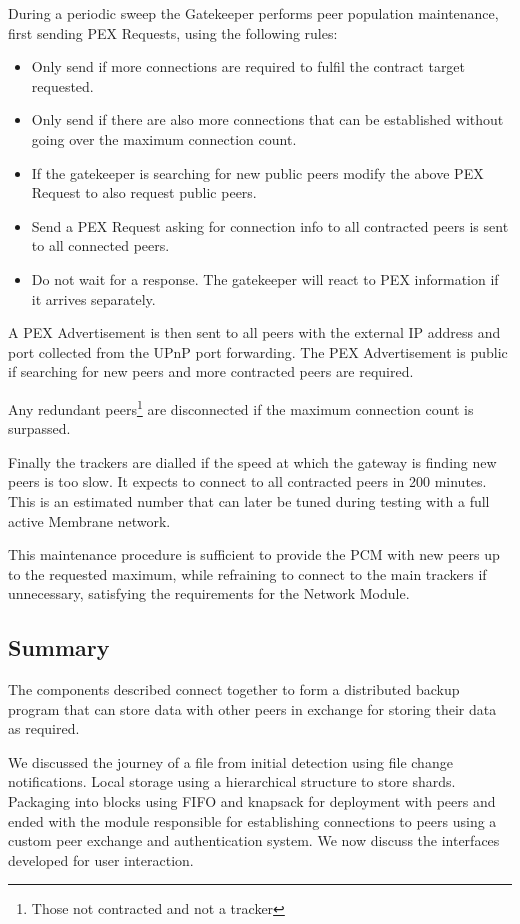 \documentclass[11pt, a4paper, twoside]{report}
\begin{document}
During a periodic sweep the Gatekeeper performs peer population maintenance, first sending PEX Requests, using the following rules:

\begin{itemize}
 \item Only send if more connections are required to fulfil the contract target requested.
 \item Only send if there are also more connections that can be established without going over the maximum connection count.
 \item If the gatekeeper is searching for new public peers modify the above PEX Request to also request public peers.
 \item Send a PEX Request asking for connection info to all contracted peers is sent to all connected peers.
 \item Do not wait for a response. The gatekeeper will react to PEX information if it arrives separately.
\end{itemize}

A PEX Advertisement is then sent to all peers with the external IP address and port collected from the UPnP port forwarding. The PEX Advertisement is public if searching for new peers and more contracted peers are required.

Any redundant peers\footnote{Those not contracted and not a tracker} are disconnected if the maximum connection count is surpassed.

Finally the trackers are dialled if the speed at which the gateway is finding new peers is too slow. It expects to connect to all contracted peers in 200 minutes. This is an estimated number that can later be tuned during testing with a full active Membrane network.

This maintenance procedure is sufficient to provide the PCM with new peers up to the requested maximum, while refraining to connect to the main trackers if unnecessary, satisfying the requirements for the Network Module.

\subsection{Summary}

The components described connect together to form a distributed backup program that can store data with other peers in exchange for storing their data as required.

We discussed the journey of a file from initial detection using file change notifications. Local storage using a hierarchical structure to store shards. Packaging into blocks using FIFO and knapsack for deployment with peers and ended with the module responsible for establishing connections to peers using a custom peer exchange and authentication system. We now discuss the interfaces developed for user interaction.
\end{document}
